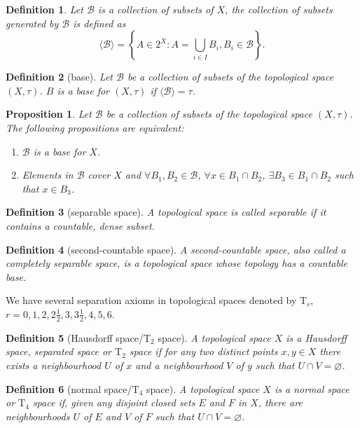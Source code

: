 \documentclass{report}
\newtheorem{definition}{Definition}[section]
\newtheorem{proposition}{Proposition}[section]
\theoremstyle{nonumberplain}
\begin{document}
\begin{definition}
	Let $\mathcal{B}$ is a collection of subsets of $X$, the collection of subsets generated by $\mathcal{B}$ is defined as
	\[
	\langle\mathcal{B}\rangle=\left\{A\in 2^X:A=\bigcup_{i\in I} B_i,B_i\in\mathcal{B}\right\}.
	\]
\end{definition}
\begin{definition}[base]
	 Let $\mathcal{B}$ be a collection of subsets of the topological space $(X,\tau)$. $B$ is a \emph{base} for $(X,\tau)$ if 
	 $\langle\mathcal{B}\rangle=\tau$.
\end{definition}
\begin{proposition}
	Let $\mathcal{B}$ be a collection of subsets of the topological space $(X,\tau)$. The following propositions are equivalent:
	\begin{enumerate}
		\item $\mathcal{B}$ is a base for $X$. 
		\item Elements in $\mathcal{B}$ cover $X$ and $\forall B_1,B_2\in\mathcal{B}$, $\forall x\in B_1\cap B_2$, $\exists B_3\in B_1\cap B_2$ such that $x\in B_3$.
	\end{enumerate}
\end{proposition}


\begin{definition}[separable space]
	 A topological space is called \emph{separable} if it contains a countable, dense subset.
\end{definition}

\begin{definition}[second-countable space]
	A \emph{second-countable} space, also called a completely separable space, is a topological space whose topology has a countable base. 
\end{definition}

We have several separation axioms in topological spaces denoted by $\mathrm{T}_r$, $r=0,1,2,2\frac{1}{2},3,3\frac{1}{2},4,5,6$.
\begin{definition}[Hausdorff space/$\mathrm{T}_2$ space]
	A topological space $X$ is a \emph{Hausdorff space}, separated space or $\mathrm{T}_2$ space if for any two distinct points $x,y\in X$ there exists a neighbourhood $U$ of $x$ and a neighbourhood $V$ of $y$ such that $U\cap V=\varnothing$. 
\end{definition}
\begin{definition}[normal space/$\mathrm{T}_4$ space]
	A topological space $X$ is a \emph{normal space} or $\mathrm{T}_4$ space if, given any disjoint closed sets $E$ and $F$ in $X$, there are neighbourhoods $U$ of $E$ and $V$ of $F$ such that $U\cap V=\varnothing$. 
\end{definition}
\end{document}
